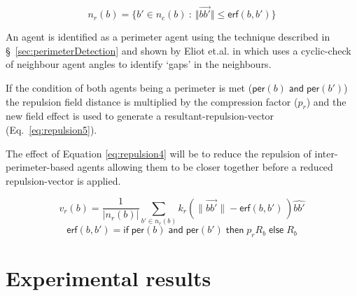 \documentclass[12pt,a4paper]{IEEEtran}
\newcommand{\magn}[1]{\Vert{#1}\Vert}
\begin{document}
\begin{equation}\label{eq:repulsion3}
n_r(b) = \{b' \in n_c(b)~:~\magn{\vec{bb'}} \leq \mathsf{erf}(b,b')\}
\end{equation}

An agent is identified as a perimeter agent using the technique described in \S~\ref{sec:perimeterDetection} and shown by Eliot et.al. in \cite{eliot2019void} which uses a cyclic-check of neighbour agent angles to identify `gaps' in the neighbours.

If the condition of both agents being a perimeter is met ($\mathsf{per}(b) \; \mathsf{and} \; \mathsf{per}(b')$) the repulsion field distance is multiplied by the compression factor ($p_r$) and the new field effect is used to generate a resultant-repulsion-vector (Eq.~\ref{eq:repulsion5}). 

The effect of Equation \ref{eq:repulsion4} will be to reduce the repulsion of inter-perimeter-based agents allowing them to be closer together before a reduced repulsion-vector is applied. 

\small
\begin{equation}\label{eq:repulsion4}
v_r(b) = \frac{1}{\lvert n_r(b)\rvert}\sum_{b' \in n_r(b)} k_r\left(\lVert\vec{bb'}\rVert - \mathsf{erf}(b,b') \, \right)\widehat{bb'}
\end{equation}
\normalsize
\small
\begin{equation}\label{eq:repulsion5}
\mathsf{erf}(b, b') = \mathsf{if} \;
\mathsf{per}(b) \; \mathsf{and} \; \mathsf{per}(b') \; \mathsf{then} \;
p_rR_b \; \mathsf{else} \; R_b
\end{equation}
\normalsize

\section{Experimental results\label{sec:ExperimentalResults}}
\end{document}
